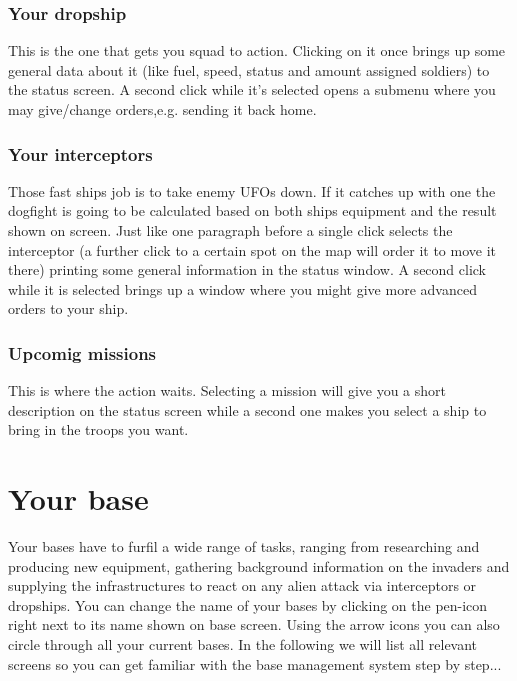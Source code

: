 \subsubsection{Your dropship}
This is the one that gets you squad to action. Clicking on it once brings up some general data about it (like fuel, speed, status and amount assigned soldiers) to the status screen. A second click while it's selected opens a submenu where you may give/change orders,e.g. sending it back home.
\subsubsection{Your interceptors}
Those fast ships job is to take enemy UFOs down. If it catches up with one the dogfight is going to be calculated based on both ships equipment and the result shown on screen. Just like one paragraph before a single click selects the interceptor (a further click to a certain spot on the map will order it to move it there) printing some general information in the status window. A second click while it is selected brings up a window where you might give more advanced orders to your ship.
\subsubsection{Upcomig missions}
This is where the action waits. Selecting a mission will give you a short description on the status screen while a second one makes you select a ship to bring in the troops you want.


\section{Your base}
Your bases have to furfil a wide range of tasks, ranging from researching and producing new equipment, gathering background information on the invaders and supplying the infrastructures to react on any alien attack via interceptors or dropships. You can change the name of your bases by clicking on the pen-icon right next to its name shown on base screen. Using the arrow icons you can also circle through all your current bases. In the following we will list all relevant screens so you can get familiar with the base management system step by step...

